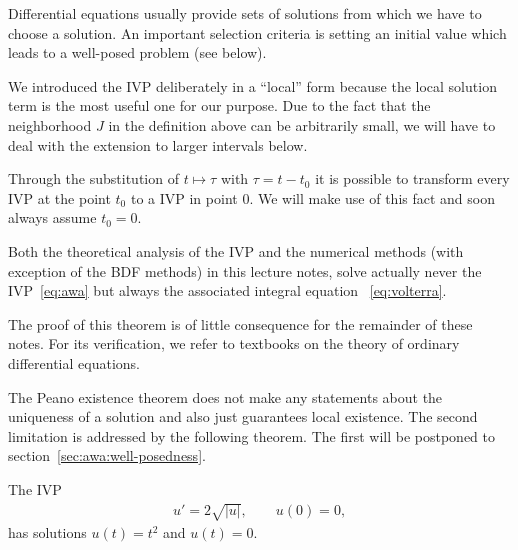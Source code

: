 Differential equations usually provide sets of solutions from which we
have to choose a solution. An important selection criteria is setting
an initial value which leads to a well-posed problem (see below).




\begin{remark}
  We introduced the IVP deliberately in a ``local'' form because the
  local solution term is the most useful one for our purpose. Due to
  the fact that the neighborhood $J$ in the definition above can be
  arbitrarily small, we will have to deal with the extension to larger
  intervals below.
\end{remark}

\begin{remark}
  Through the substitution of $t\mapsto \tau$ with $\tau = t-t_0$ it
  is possible to transform every IVP at the point $t_0$ to a IVP in
  point $0$. We will make use of this fact and soon always assume
  $t_0 = 0$.
\end{remark}



\begin{remark}
  Both the theoretical analysis of the IVP and the numerical methods
  (with exception of the BDF methods) in this lecture notes, solve
  actually never the IVP~\eqref{eq:awa} but always the associated
  integral equation ~\eqref{eq:volterra}.
\end{remark}



The proof of this theorem is of little consequence for the remainder
of these notes.  For its verification, we refer to textbooks on the
theory of ordinary differential equations.

\begin{remark}
  The Peano existence theorem does not make any statements about the
  uniqueness of a solution and also just guarantees local existence.
  The second limitation is addressed by the following theorem. The
  first will be postponed to section~\ref{sec:awa:well-posedness}.
\end{remark}



\begin{example}
  The IVP
  \begin{gather*}
    u' = 2 \sqrt{\lvert u \rvert}, \qquad u(0) = 0,
  \end{gather*}
  has solutions $u(t) = t^2$ and $u(t) = 0$.
\end{example}

